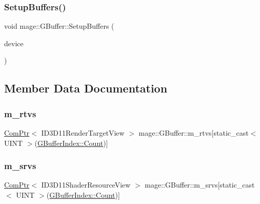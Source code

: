 \hypertarget{structmage_1_1_g_buffer_a5b0d4c4b0e29afad8524d11f66a5ff3d}{}\label{structmage_1_1_g_buffer_a5b0d4c4b0e29afad8524d11f66a5ff3d} 
\subsubsection{\texorpdfstring{Setup\+Buffers()}{SetupBuffers()}}
{\footnotesize\ttfamily void mage\+::\+G\+Buffer\+::\+Setup\+Buffers (\begin{DoxyParamCaption}\item[{I\+D3\+D11\+Device2 $\ast$}]{device }\end{DoxyParamCaption})\hspace{0.3cm}{\ttfamily [private]}}



\subsection{Member Data Documentation}
\hypertarget{structmage_1_1_g_buffer_aae23d7eabe9c4dec3f0c9a7e40965935}{}\label{structmage_1_1_g_buffer_aae23d7eabe9c4dec3f0c9a7e40965935} 
\subsubsection{\texorpdfstring{m\+\_\+rtvs}{m\_rtvs}}
{\footnotesize\ttfamily \hyperlink{namespacemage_ae74f374780900893caa5555d1031fd79}{Com\+Ptr}$<$ I\+D3\+D11\+Render\+Target\+View $>$ mage\+::\+G\+Buffer\+::m\+\_\+rtvs\mbox{[}static\+\_\+cast$<$ U\+I\+NT $>$(\hyperlink{structmage_1_1_g_buffer_a72f0fc0f46052fdc9872c48c57894607ae93f994f01c537c4e2f7d8528c3eb5e9}{G\+Buffer\+Index\+::\+Count})\mbox{]}\hspace{0.3cm}{\ttfamily [private]}}

\hypertarget{structmage_1_1_g_buffer_a5a73e6c70c86cfb818e99c98e1bd11e4}{}\label{structmage_1_1_g_buffer_a5a73e6c70c86cfb818e99c98e1bd11e4} 
\subsubsection{\texorpdfstring{m\+\_\+srvs}{m\_srvs}}
{\footnotesize\ttfamily \hyperlink{namespacemage_ae74f374780900893caa5555d1031fd79}{Com\+Ptr}$<$ I\+D3\+D11\+Shader\+Resource\+View $>$ mage\+::\+G\+Buffer\+::m\+\_\+srvs\mbox{[}static\+\_\+cast$<$ U\+I\+NT $>$(\hyperlink{structmage_1_1_g_buffer_a72f0fc0f46052fdc9872c48c57894607ae93f994f01c537c4e2f7d8528c3eb5e9}{G\+Buffer\+Index\+::\+Count})\mbox{]}\hspace{0.3cm}{\ttfamily [private]}}

